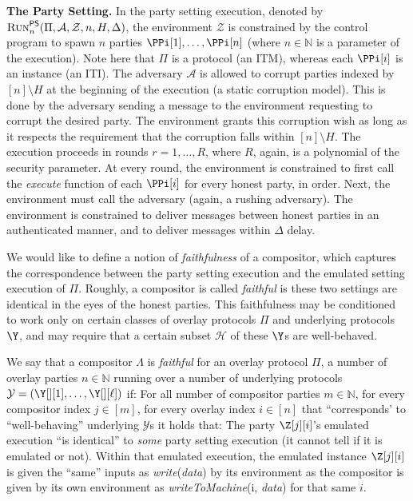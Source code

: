 \noindent
\textbf{The Party Setting.}
In the party setting execution, denoted by $\textsc{Run}^{\textsf{PS}}_n(\Pi,\allowbreak \mathcal{A},\allowbreak \mathcal{Z},\allowbreak n,\allowbreak H,\allowbreak \Delta)$,
the environment $\mathcal{Z}$ is constrained by the control program
to spawn $n$ parties $\PPi[1], \ldots, \PPi[n]$ (where $n \in \mathbb{N}$
is a parameter of the execution). Note here that $\Pi$ is a protocol (an ITM),
whereas each $\PPi[i]$ is an instance (an ITI).
The adversary $\mathcal{A}$ is allowed to corrupt parties
indexed by $[n] \setminus H$ at the beginning of the execution
(a static corruption model). This is done by the adversary sending a message
to the environment requesting to corrupt the desired party. The environment
grants this corruption wish as long as it respects the requirement that the
corruption falls within $[n] \setminus H$.
The execution proceeds in rounds
$r = 1, \ldots, R$, where $R$, again, is a polynomial of the security
parameter. At every round, the environment is constrained to first
call the \emph{execute} function of each $\PPi[i]$ for every
honest party, in order. Next, the environment must call
the adversary (again, a rushing adversary). The environment
is constrained to deliver messages between honest parties
in an authenticated manner, and to deliver messages within $\Delta$
delay.

We would like to define a notion of \emph{faithfulness} of a
compositor, which captures the
correspondence between the party setting execution and the emulated setting
execution of $\Pi$. Roughly, a compositor is called \emph{faithful} is these
two settings are identical in the eyes of the honest parties.
This faithfulness may be conditioned to work only on certain classes
of overlay protocols $\Pi$ and underlying protocols $\Y$, and may
require that a certain subset $\mathcal{H}$ of these $\Y$s are well-behaved.

\begin{definition}
We say that a compositor $\Lambda$ is \emph{faithful} for an overlay protocol $\Pi$,
a number of overlay parties $n \in \mathbb{N}$ running
over a number of underlying protocols $\mathcal{Y} = (\Y[][1], \ldots, \Y[][\ell])$
if:
For all number of compositor parties $m \in \mathbb{N}$,
for every compositor index $j \in [m]$,
for every overlay index $i \in [n]$ that ``corresponds' to ``well-behaving'' underlying $\mathcal{Y}$s
it holds that:
The party $\Z[j][i]$'s emulated execution ``is identical'' to \emph{some} party setting execution
(it cannot tell if it is emulated or not).
Within that emulated execution, the emulated instance $\Z[j][i]$
is given the ``same'' inputs as \emph{write}(\emph{data}) by its environment
as the compositor is given by its own environment as \emph{writeToMachine}(i, \emph{data})
for that same $i$.
\end{definition}

